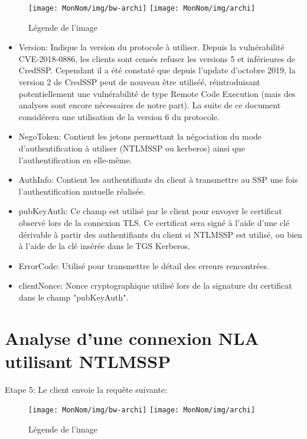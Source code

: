 \begin{figure}[ht]
  \centering
  \ifssticbw
    \texttt{[image: MonNom/img/bw-archi]}
  \else
    \texttt{[image: MonNom/img/archi]}
  \fi
  \caption{Légende de l'image}
  \label{fig:monnom:archi}
\end{figure}

\begin{itemize}
	\item Version: Indique la version du protocole à utiliser. Depuis la vulnérabilité CVE-2018-0886, les clients sont censés refuser les versions 5 et inférieures de CredSSP. Cependant il a été constaté que depuis l’update d’octobre 2019, la version 2 de CredSSP peut de nouveau être utiliséé, réintroduisant potentiellement une vulnérabilité de type Remote Code Execution (mais des analyses sont encore nécessaires de notre part). La suite de ce document considérera une utilisation de la version 6 du protocole.
	\item NegoToken: Contient les jetons permettant la négociation du mode d'authentification à utiliser (NTLMSSP ou kerberos) ainsi que l'authentification en elle-même.
	\item AuthInfo: Contient les authentifiants du client à transmettre au SSP une fois l'authentification mutuelle réalisée. 
	\item pubKeyAuth: Ce champ est utilisé par le client pour envoyer le certificat observé lors de la connexion TLS. Ce certificat sera signé à l'aide d'une clé dérivable à partir des authentifiants du client si NTLMSSP est utilisé, ou bien à l'aide de la clé insérée dans le TGS Kerberos. 
	\item ErrorCode: Utilisé pour transmettre le détail des erreurs rencontrées.
	\item clientNonce: Nonce cryptographique utilisé lors de la signature du certificat dans le champ "pubKeyAuth".
\end{itemize}

\section{Analyse d'une connexion NLA utilisant NTLMSSP}

Etape 5: Le client envoie la requête suivante:

\begin{figure}[ht]
  \centering
  \ifssticbw
    \texttt{[image: MonNom/img/bw-archi]}
  \else
    \texttt{[image: MonNom/img/archi]}
  \fi
  \caption{Légende de l'image}
  \label{fig:monnom:archi}
\end{figure}

